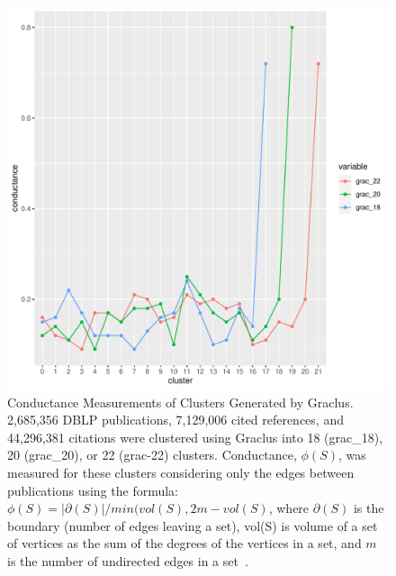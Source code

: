 \newpage

\begin{figure}[ht]
\centering
  \includegraphics[scale=0.4]{graclus_comparison.pdf}
\caption{Conductance Measurements of Clusters Generated by Graclus.  2,685,356 DBLP publications, 7,129,006 cited references, and 44,296,381 citations were clustered using Graclus into 18 (grac\_18), 20 (grac\_20), or 22 (grac-22) clusters. Conductance, $\phi(S)$, was measured for these clusters considering only the edges between publications using the formula: $\phi(S)=|\partial(S)|/min(vol(S),2m-vol(S)$, where $\partial(S)$ is the boundary (number of edges leaving a set), vol(S) is volume of a set of vertices as the sum of the degrees of the vertices in a set, and $m$ is the number of undirected edges in a set~\cite{shun_parallel_2016}.}
\label{fig:graclus_comparison_conductance}       
\end{figure}

\newpage

